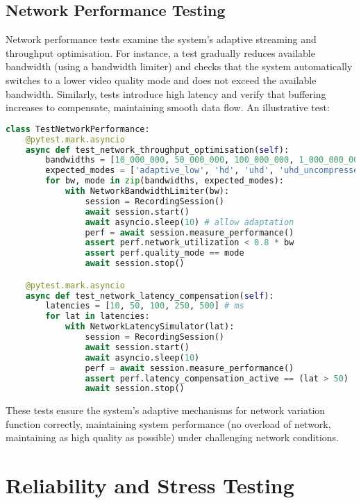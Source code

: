 \documentclass[11pt,a4paper]{report}
\begin{document}
\subsection{Network Performance Testing}
Network performance tests examine the system’s adaptive streaming and throughput optimisation. For instance, a test gradually reduces available bandwidth (using a bandwidth limiter) and checks that the system automatically switches to a lower video quality mode and does not exceed the available bandwidth. Similarly, tests introduce high latency and verify that buffering increases to compensate, maintaining smooth data flow.
An illustrative test:
\begin{lstlisting}[language=Python]
class TestNetworkPerformance:
    @pytest.mark.asyncio
    async def test_network_throughput_optimisation(self):
        bandwidths = [10_000_000, 50_000_000, 100_000_000, 1_000_000_000]
        expected_modes = ['adaptive_low', 'hd', 'uhd', 'uhd_uncompressed']
        for bw, mode in zip(bandwidths, expected_modes):
            with NetworkBandwidthLimiter(bw):
                session = RecordingSession()
                await session.start()
                await asyncio.sleep(10) # allow adaptation
                perf = await session.measure_performance()
                assert perf.network_utilization < 0.8 * bw
                assert perf.quality_mode == mode
                await session.stop()

    @pytest.mark.asyncio
    async def test_network_latency_compensation(self):
        latencies = [10, 50, 100, 250, 500] # ms
        for lat in latencies:
            with NetworkLatencySimulator(lat):
                session = RecordingSession()
                await session.start()
                await asyncio.sleep(10)
                perf = await session.measure_performance()
                assert perf.latency_compensation_active == (lat > 50)
                await session.stop()
\end{lstlisting}
These tests ensure the system’s adaptive mechanisms for network variation function correctly, maintaining system performance (no overload of network, maintaining as high quality as possible) under challenging network conditions.
\section{Reliability and Stress Testing}
\end{document}
